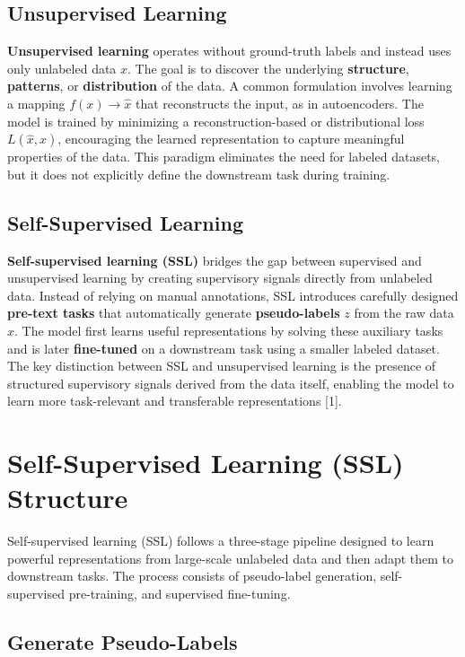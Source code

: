 \documentclass{article}
\renewcommand{\cite}[1]{[#1]}
\begin{document}
\subsection*{Unsupervised Learning}

\textbf{Unsupervised learning} operates without ground-truth labels and instead uses only unlabeled data $x$. The goal is to discover the underlying \textbf{structure}, \textbf{patterns}, or \textbf{distribution} of the data. A common formulation involves learning a mapping $f(x)\rightarrow\hat{x}$ that reconstructs the input, as in autoencoders. The model is trained by minimizing a reconstruction-based or distributional loss $L(\hat{x},x)$, encouraging the learned representation to capture meaningful properties of the data. This paradigm eliminates the need for labeled datasets, but it does not explicitly define the downstream task during training.

\subsection*{Self-Supervised Learning}

\textbf{Self-supervised learning (SSL)} bridges the gap between supervised and unsupervised learning by creating supervisory signals directly from unlabeled data. Instead of relying on manual annotations, SSL introduces carefully designed \textbf{pre-text tasks} that automatically generate \textbf{pseudo-labels} $z$ from the raw data $x$. The model first learns useful representations by solving these auxiliary tasks and is later \textbf{fine-tuned} on a downstream task using a smaller labeled dataset. The key distinction between SSL and unsupervised learning is the presence of structured supervisory signals derived from the data itself, enabling the model to learn more task-relevant and transferable representations \cite{1}.

\section{Self-Supervised Learning (SSL) Structure}

Self-supervised learning (SSL) follows a three-stage pipeline designed to learn powerful representations from large-scale unlabeled data and then adapt them to downstream tasks. The process consists of pseudo-label generation, self-supervised pre-training, and supervised fine-tuning.

\subsection*{Generate Pseudo-Labels}
\end{document}

